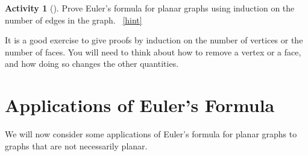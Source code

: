 \documentclass[10pt,]{book}
\theoremstyle{plain}
\theoremstyle{definition}
\theoremstyle{definition}
\theoremstyle{definition}
\newtheorem{activity}[project]{Activity}
\numberwithin{equation}{chapter}
\begin{document}
\begin{activity}[]\label{activity-20}
\hypertarget{p-260}{}%
Prove Euler's formula for planar graphs using induction on the number of edges in the graph.%
~\hfill{\tiny\hyperlink{a-25}{[hint]}\hypertarget{q-25}{}}\end{activity}
\hypertarget{p-262}{}%
It is a good exercise to give proofs by induction on the number of vertices or the number of faces.  You will need to think about how to remove a vertex or a face, and how doing so changes the other quantities.%
\typeout{************************************************}
\typeout{************************************************}
\section[{Applications of Euler's Formula}]{Applications of Euler's Formula}\label{sec_eulerapps}
\hypertarget{p-263}{}%
We will now consider some applications of Euler's formula for planar graphs to graphs that are not necessarily planar.%
\typeout{************************************************}
\typeout{************************************************}
\end{document}

